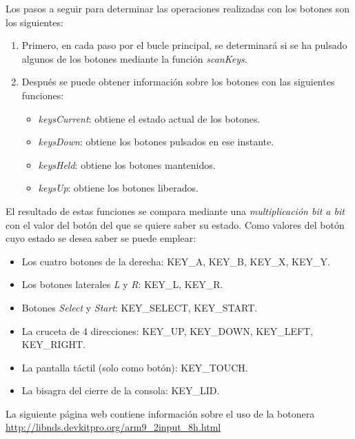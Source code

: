 Los pasos a seguir para determinar las operaciones realizadas con los botones son los siguientes:
\begin{enumerate}
\item Primero, en cada paso por el bucle principal, se determinará si se ha pulsado algunos de los botones mediante la función \textit{scanKeys}. 
%
\item Después se puede  obtener información sobre los botones con las siguientes funciones:
\begin{itemize}
	\item \textit{keysCurrent}: obtiene el estado actual de los botones.
	\item \textit{keysDown}: obtiene los botones pulsados en ese instante.
	\item \textit{keysHeld}: obtiene los botones mantenidos.
	\item \textit{keysUp}: obtiene los botones liberados.
\end{itemize}
\end{enumerate}

El resultado de estas funciones se compara mediante una \textit{multiplicación bit a bit} con el valor del botón del que se quiere saber su estado. Como valores del botón cuyo estado se desea saber se puede emplear: 
\begin{itemize}
\item Los cuatro botones de la derecha: KEY\_A, KEY\_B, KEY\_X, KEY\_Y.
\item Los botones laterales \textit{L} y \textit{R}: KEY\_L, KEY\_R.
\item Botones \textit{Select} y \textit{Start}: KEY\_SELECT, KEY\_START.
\item La cruceta de 4 direcciones: KEY\_UP, KEY\_DOWN, KEY\_LEFT, KEY\_RIGHT.
\item La pantalla táctil (solo como botón): KEY\_TOUCH.
\item La bisagra del cierre de la consola: KEY\_LID.
\end{itemize}

La siguiente página web contiene información sobre el uso de la botonera \url{http://libnds.devkitpro.org/arm9_2input_8h.html}

